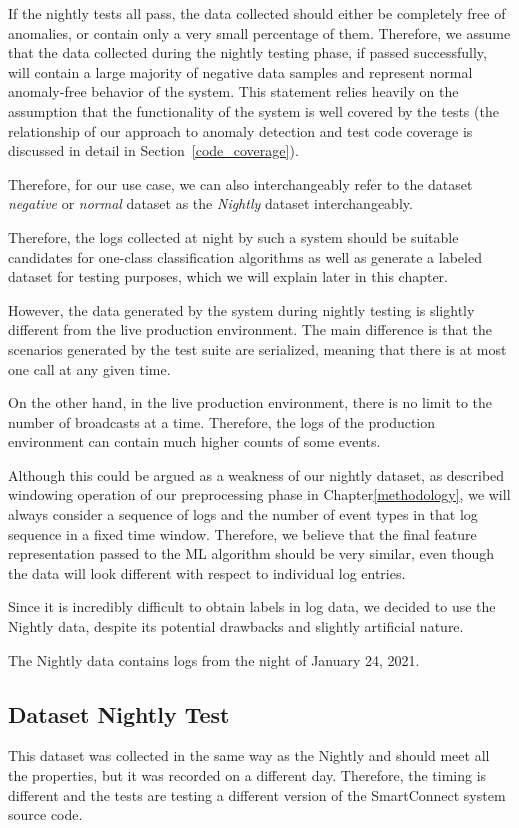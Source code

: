 If the nightly tests all pass, the data collected should either be completely free of anomalies, or contain only a very small percentage of them. 
Therefore, we assume that the data collected during the nightly testing phase, if passed successfully, will contain a large majority of negative data samples and represent normal anomaly-free behavior of the system. This statement relies heavily on the assumption that the functionality of the system is well covered by the tests (the relationship of our approach to anomaly detection and test code coverage is discussed in detail in Section~\ref{code_coverage}). 

Therefore, for our use case, we can also interchangeably refer to the dataset \textit{negative} or \textit{normal} dataset as the \textit{Nightly} dataset interchangeably.

Therefore, the logs collected at night by such a system should be suitable candidates for one-class classification algorithms as well as generate a labeled dataset for testing purposes, which we will explain later in this chapter.

However, the data generated by the system during nightly testing is slightly different from the live production environment. The main difference is that the scenarios generated by the test suite are serialized, meaning that there is at most one call at any given time. 

On the other hand, in the live production environment, there is no limit to the number of broadcasts at a time. Therefore, the logs of the production environment can contain much higher counts of some events.

Although this could be argued as a weakness of our nightly dataset, as described windowing operation of our preprocessing phase in Chapter\ref{methodology}, we will always consider a sequence of logs and the number of event types in that log sequence in a fixed time window. Therefore, we believe that the final feature representation passed to the ML algorithm should be very similar, even though the data will look different with respect to individual log entries.

Since it is incredibly difficult to obtain labels in log data, we decided to use the Nightly data, despite its potential drawbacks and slightly artificial nature.

The Nightly data contains logs from the night of January 24, 2021.

\subsection{Dataset Nightly Test}
This dataset was collected in the same way as the Nightly and should meet all the properties, but it was recorded on a different day. Therefore, the timing is different and the tests are testing a different version of the SmartConnect system source code.

